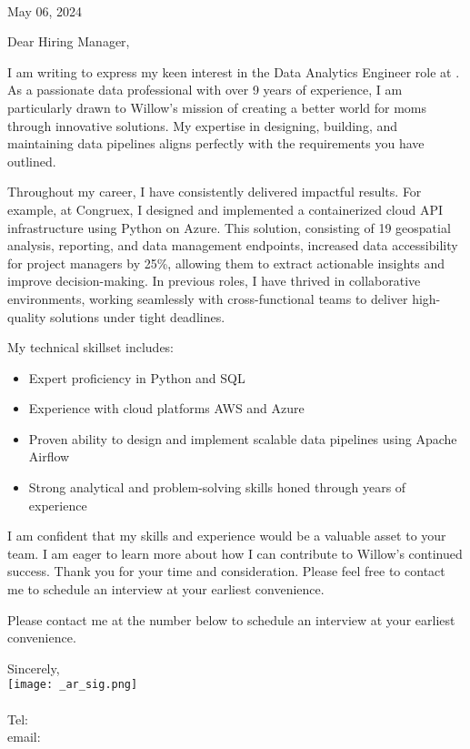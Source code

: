 \documentclass[letterpaper]{article}
\begin{document}
\large
\textbf{\JobCompany} \\

\null\hfill May 06, 2024

Dear Hiring Manager,

I am writing to express my keen interest in the Data Analytics Engineer role at
\JobCompany.
As a passionate data professional with over 9 years of
experience, I am particularly drawn to Willow's mission of creating a better
world for moms through innovative solutions.
My expertise in designing,
building, and maintaining data pipelines aligns perfectly with the requirements
you have outlined.

Throughout my career, I have consistently delivered impactful results.
For example, at Congruex, I designed and implemented a containerized cloud API
infrastructure using Python on Azure.
This solution, consisting of 19 geospatial analysis, reporting, and data management endpoints, increased data
accessibility for project managers by 25\%, allowing them to extract actionable
insights and improve decision-making.
In previous roles, I have thrived in collaborative environments, working seamlessly with cross-functional teams to
deliver high-quality solutions under tight deadlines.

My technical skillset includes:

\vspace{-12pt}
\begin{itemize} \itemsep 0pt
\item Expert proficiency in Python and SQL
\item Experience with cloud platforms AWS and Azure
\item Proven ability to design and implement scalable data pipelines using Apache Airflow
\item Strong analytical and problem-solving skills honed through years of experience
\end{itemize}

I am confident that my skills and experience would be a valuable asset to your team.
I am eager to learn more about how I can contribute to Willow's continued success.
Thank you for your time and consideration.
Please feel free to contact me to schedule an interview at your earliest convenience.



Please contact me at the number below to schedule an interview at your earliest convenience.

Sincerely,\\
    \hspace{1em}
    \texttt{[image: \_ar\_sig.png]} \\
    \CVsigname \\
    \small
    Tel: \CVphone \\
    email: \CVemail
\end{document}
